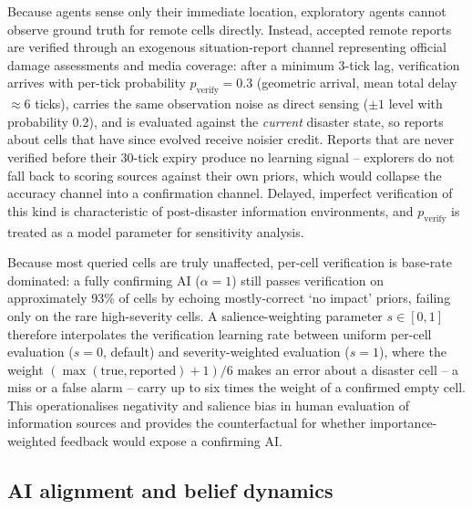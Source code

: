 \documentclass[pdflatex,sn-nature]{sn-jnl}
\begin{document}
Because agents sense only their immediate location, exploratory agents cannot observe ground truth for remote cells directly. Instead, accepted remote reports are verified through an exogenous situation-report channel representing official damage assessments and media coverage: after a minimum 3-tick lag, verification arrives with per-tick probability $p_{\text{verify}} = 0.3$ (geometric arrival, mean total delay $\approx 6$ ticks), carries the same observation noise as direct sensing ($\pm 1$ level with probability 0.2), and is evaluated against the \emph{current} disaster state, so reports about cells that have since evolved receive noisier credit. Reports that are never verified before their 30-tick expiry produce no learning signal -- explorers do not fall back to scoring sources against their own priors, which would collapse the accuracy channel into a confirmation channel. Delayed, imperfect verification of this kind is characteristic of post-disaster information environments, and $p_{\text{verify}}$ is treated as a model parameter for sensitivity analysis.

Because most queried cells are truly unaffected, per-cell verification is base-rate dominated: a fully confirming AI ($\alpha = 1$) still passes verification on approximately 93\% of cells by echoing mostly-correct `no impact' priors, failing only on the rare high-severity cells. A salience-weighting parameter $s \in [0, 1]$ therefore interpolates the verification learning rate between uniform per-cell evaluation ($s = 0$, default) and severity-weighted evaluation ($s = 1$), where the weight $(\max(\text{true}, \text{reported}) + 1)/6$ makes an error about a disaster cell -- a miss or a false alarm -- carry up to six times the weight of a confirmed empty cell. This operationalises negativity and salience bias in human evaluation of information sources and provides the counterfactual for whether importance-weighted feedback would expose a confirming AI.

\subsection{AI alignment and belief dynamics}\label{sec:alignment}
\end{document}
